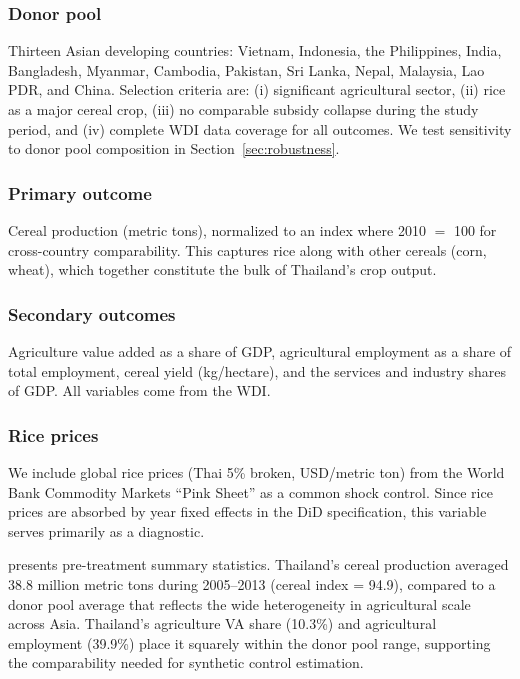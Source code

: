 \documentclass[12pt]{article}
\begin{document}
\subsubsection*{Donor pool} Thirteen Asian developing countries: Vietnam, Indonesia, the Philippines, India, Bangladesh, Myanmar, Cambodia, Pakistan, Sri Lanka, Nepal, Malaysia, Lao PDR, and China. Selection criteria are: (i) significant agricultural sector, (ii) rice as a major cereal crop, (iii) no comparable subsidy collapse during the study period, and (iv) complete WDI data coverage for all outcomes. We test sensitivity to donor pool composition in Section~\ref{sec:robustness}.

\subsubsection*{Primary outcome} Cereal production (metric tons), normalized to an index where 2010 $=$ 100 for cross-country comparability. This captures rice along with other cereals (corn, wheat), which together constitute the bulk of Thailand's crop output.

\subsubsection*{Secondary outcomes} Agriculture value added as a share of GDP, agricultural employment as a share of total employment, cereal yield (kg/hectare), and the services and industry shares of GDP. All variables come from the WDI.

\subsubsection*{Rice prices} We include global rice prices (Thai 5\% broken, USD/metric ton) from the World Bank Commodity Markets ``Pink Sheet'' as a common shock control. Since rice prices are absorbed by year fixed effects in the DiD specification, this variable serves primarily as a diagnostic.

 presents pre-treatment summary statistics. Thailand's cereal production averaged 38.8 million metric tons during 2005--2013 (cereal index = 94.9), compared to a donor pool average that reflects the wide heterogeneity in agricultural scale across Asia. Thailand's agriculture VA share (10.3\%) and agricultural employment (39.9\%) place it squarely within the donor pool range, supporting the comparability needed for synthetic control estimation.
\end{document}
